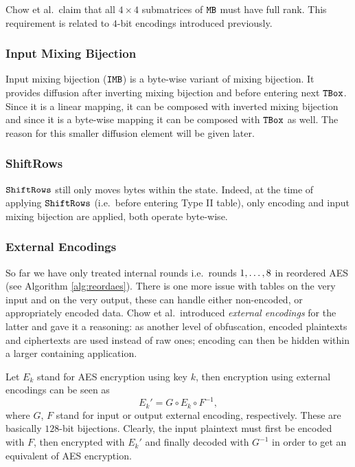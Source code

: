 	\begin{note}
	\label{note:fullrank}
		Chow et al.\ claim that all $4\times4$ submatrices of $\texttt{MB}$ must have full rank. This requirement is related to $4$-bit encodings introduced previously.
	\end{note}

\subsubsection{Input Mixing Bijection}
	
	Input mixing bijection ($\texttt{IMB}$) is a byte-wise variant of mixing bijection. It provides diffusion after inverting mixing bijection and before entering next $\texttt{TBox}$. Since it is a linear mapping, it can be composed with inverted mixing bijection and since it is a byte-wise mapping it can be composed with $\texttt{TBox}$ as well. The reason for this smaller diffusion element will be given later.

\subsubsection{ShiftRows}
	
	$\texttt{ShiftRows}$ still only moves bytes within the state. Indeed, at the time of applying $\texttt{ShiftRows}$ (i.e.\ before entering Type II table), only encoding and input mixing bijection are applied, both operate byte-wise.

\subsubsection{External Encodings}
	
	So far we have only treated internal rounds i.e.\ rounds $1 , \ldots , 8$ in reordered AES (see Algorithm \ref{alg:reordaes}). There is one more issue with tables on the very input and on the very output, these can handle either non-encoded, or appropriately encoded data. Chow et al.\ introduced {\em external encodings} for the latter and gave it a reasoning: as another level of obfuscation, encoded plaintexts and ciphertexts are used instead of raw ones; encoding can then be hidden within a larger containing application. %
	
	Let $E_k$ stand for AES encryption using key $k$, then encryption using external encodings can be seen as
	\begin{equation}
	\label{eq:extenc}
		E_k' = G \circ E_k \circ F^{-1} ,
	\end{equation}
	where $G$, $F$ stand for input or output external encoding, respectively. These are basically $128$-bit bijections. Clearly, the input plaintext must first be encoded with $F$, then encrypted with $E_k'$ and finally decoded with $G^{-1}$ in order to get an equivalent of AES encryption.
	
